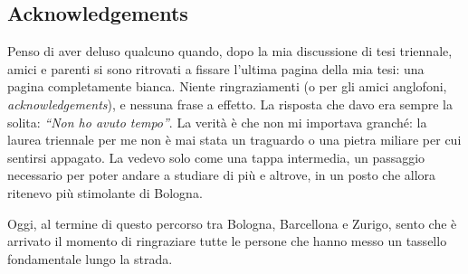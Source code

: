 \subsection*{Acknowledgements}

Penso di aver deluso qualcuno quando, dopo la mia discussione di tesi triennale, amici e parenti si sono ritrovati a fissare l’ultima pagina della mia tesi: una pagina completamente bianca. Niente ringraziamenti (o per gli amici anglofoni, \textit{acknowledgements}), e nessuna frase a effetto. 
La risposta che davo era sempre la solita: \textit{``Non ho avuto tempo''}. La verità è che non mi importava granché: la laurea triennale per me non è mai stata un traguardo o una pietra miliare per cui sentirsi appagato. La vedevo solo come una tappa intermedia, un passaggio necessario per poter andare a studiare di più e altrove, in un posto che allora ritenevo più stimolante di Bologna.

Oggi, al termine di questo percorso tra Bologna, Barcellona e Zurigo, sento che è arrivato il momento di ringraziare tutte le persone che hanno messo un tassello fondamentale lungo la strada.


